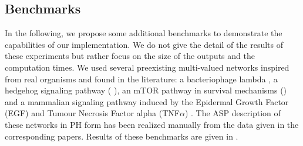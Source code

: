 \subsection{Benchmarks}
In the following, we propose some additional benchmarks to demonstrate
the capabilities of our implementation.
We do not give the detail of the results of these experiments
but rather focus on the size of the outputs and the computation times.
We used several preexisting multi-valued networks inspired from real organisms
and found in the literature:
a bacteriophage lambda \cite{thieffry1995dynamical},
a hedgehog signaling pathway ( \cite{stecca2010context}),
an mTOR pathway in survival mechanisms \cite{javle2010inhibition} ()
and a mammalian signaling pathway induced by the Epidermal Growth Factor (EGF) and Tumour Necrosis Factor alpha (TNF$\alpha$) \cite{chaouiya2013sbml}.
The ASP description of these networks in PH form has been realized manually
from the data given in the corresponding papers.
Results of these benchmarks\benchmarksfootnote{} are given in .

